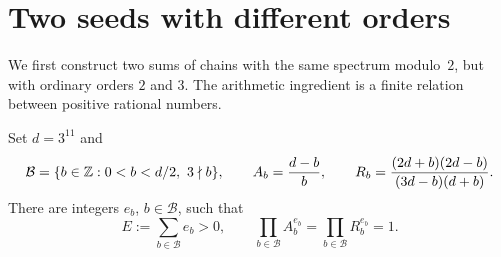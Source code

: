 \section{Two seeds with different orders}\label{seed:section}

We first construct two sums of chains with the same spectrum modulo~$2$,
but with ordinary orders $2$ and $3$.  The arithmetic ingredient is a
finite relation between positive rational numbers.

\begin{lemma}\label{seed:product}
Set $d=3^{11}$ and
\[
 \mathcal B=\{b\in\Z:0<b<d/2,\ 3\nmid b\},\qquad
 A_b=\frac{d-b}{b},\qquad
 R_b=\frac{(2d+b)(2d-b)}{(3d-b)(d+b)}.
\]
There are integers $e_b$, $b\in\mathcal B$, such that
\begin{equation}\label{seed:products}
 E:=\sum_{b\in\mathcal B}e_b>0,
 \qquad \prod_{b\in\mathcal B}A_b^{e_b}
 =\prod_{b\in\mathcal B}R_b^{e_b}=1.
\end{equation}
\end{lemma}

